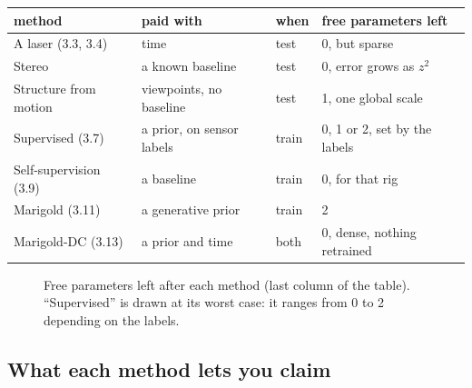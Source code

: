 \documentclass[11pt,a4paper]{article}
\theoremstyle{definition}
\theoremstyle{plain}
\theoremstyle{remark}
\begin{document}
\begin{center}\small
\begin{tabular}{@{}p{3.4cm}p{3.6cm}l p{4.2cm}@{}}\toprule
method & paid with & when & free parameters left\\\midrule
A laser (3.3, 3.4) & time & test & 0, but sparse\\
Stereo & a known baseline & test & 0, error grows as $z^2$\\
Structure from motion & viewpoints, no baseline & test & 1, one global scale\\
Supervised (3.7) & a prior, on sensor labels & train & 0, 1 or 2, set by the labels\\
Self-supervision (3.9) & a baseline & train & 0, for that rig\\
Marigold (3.11) & a generative prior & train & 2\\
Marigold-DC (3.13) & a prior and time & both & 0, dense, nothing retrained\\\bottomrule
\end{tabular}
\end{center}

\begin{figure}[H]
\centering
{}
\caption{Free parameters left after each method (last column of the table). ``Supervised'' is drawn at its worst case: it ranges from 0 to 2 depending on the labels.}
\end{figure}

\subsection*{What each method lets you claim}
\end{document}
